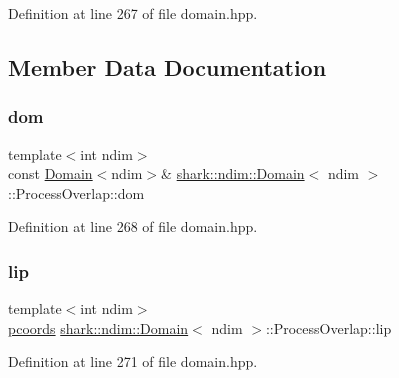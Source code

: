 Definition at line 267 of file domain.\+hpp.



\subsection{Member Data Documentation}
\hypertarget{classshark_1_1ndim_1_1_domain_1_1_process_overlap_af73890c5892d8071cdfb29e66ae4e8d8}{}\label{classshark_1_1ndim_1_1_domain_1_1_process_overlap_af73890c5892d8071cdfb29e66ae4e8d8} 
\subsubsection{\texorpdfstring{dom}{dom}}
{\footnotesize\ttfamily template$<$int ndim$>$ \\
const \hyperlink{classshark_1_1ndim_1_1_domain}{Domain}$<$ndim$>$\& \hyperlink{classshark_1_1ndim_1_1_domain}{shark\+::ndim\+::\+Domain}$<$ ndim $>$\+::Process\+Overlap\+::dom\hspace{0.3cm}{\ttfamily [private]}}



Definition at line 268 of file domain.\+hpp.

\hypertarget{classshark_1_1ndim_1_1_domain_1_1_process_overlap_ad2db26b8b1a91fd5dea72ffe01a2ac78}{}\label{classshark_1_1ndim_1_1_domain_1_1_process_overlap_ad2db26b8b1a91fd5dea72ffe01a2ac78} 
\subsubsection{\texorpdfstring{lip}{lip}}
{\footnotesize\ttfamily template$<$int ndim$>$ \\
\hyperlink{classshark_1_1ndim_1_1_domain_a9684ccd8af33cff7639c782290ac37ee}{pcoords} \hyperlink{classshark_1_1ndim_1_1_domain}{shark\+::ndim\+::\+Domain}$<$ ndim $>$\+::Process\+Overlap\+::lip\hspace{0.3cm}{\ttfamily [private]}}



Definition at line 271 of file domain.\+hpp.

